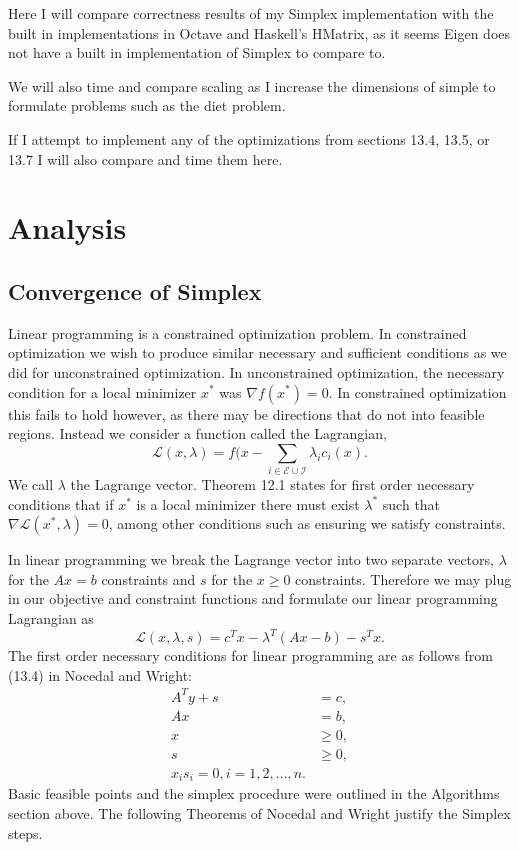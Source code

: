 \documentclass[12pt]{amsart}
\begin{document}
Here I will compare correctness results of my Simplex implementation with the built
in implementations in Octave and Haskell's HMatrix, as it seems Eigen does not
have a built in implementation of Simplex to compare to.

We will also time and compare scaling as I increase the dimensions of simple to
formulate problems such as the diet problem.

If I attempt to implement any of the optimizations from sections 13.4, 13.5, or
13.7 I will also compare and time them here.

\section{Analysis}

\subsection{Convergence of Simplex}

Linear programming is a constrained optimization problem. In constrained
optimization we wish to produce similar necessary and sufficient conditions as
we did for unconstrained optimization. In unconstrained optimization, the
necessary condition for a local minimizer $x^*$ was $\nabla f(x^*)=0$. In
constrained optimization this fails to hold however, as there may be directions
that do not into feasible regions. Instead we consider a function called the
Lagrangian,
\[
	\mathcal{L}(x,\lambda)
		=f(x-\sum_{i\in \mathcal{E}\cup\mathcal{I}}\lambda_ic_i(x).
\]
We call $\lambda$ the Lagrange vector.
Theorem 12.1 states for first order necessary conditions that if $x^*$ is a local minimizer 
there must exist $\lambda^*$ such that $\nabla\mathcal{L}(x^*,\lambda)=0$,
among other conditions such as ensuring we satisfy constraints.

In linear programming we break the
Lagrange vector into two separate vectors, $\lambda$ for the $Ax=b$ constraints
and $s$ for the $x\ge 0$ constraints. Therefore we may plug in our objective
and constraint functions and formulate our linear programming Lagrangian
as
\[
	\mathcal{L}(x,\lambda,s)=c^Tx-\lambda^T(Ax-b)-s^Tx.
\]
The first order necessary conditions for linear programming are as follows
from (13.4) in Nocedal and Wright:
\begin{align*}
A^Ty+s &= c,\\
Ax &= b,\\
x &\ge 0,\\
s &\ge 0,\\
x_is_i = 0, i=1,2,\ldots,n.
\end{align*}
Basic feasible points and the simplex procedure were outlined in the Algorithms
section above. The following Theorems of Nocedal and Wright justify the Simplex
steps.
\end{document}
